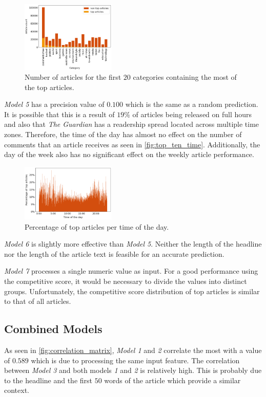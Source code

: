\begin{figure}[h]
	\includegraphics[width=0.4\textwidth]{fig/top_ten_category.png}
	\caption{\textmd{Number of articles for the first $20$ categories containing the most of the top articles.}}
	\label{fig:top_ten_category}
\end{figure}

\textit{Model 5} has a precision value of $0.100$ which is the same as a random prediction.
It is possible that this is a result of $19\%$ of articles being released on full hours and also that \textit{The Guardian} has a readership spread located across multiple time zones.
Therefore, the time of the day has almost no effect on the number of comments that an article receives as seen in \autoref{fig:top_ten_time}. 
Additionally, the day of the week also has no significant effect on the weekly article performance. 

\begin{figure}[h]
	\includegraphics[width=0.4\textwidth]{fig/top_ten_time.png}
	\caption{\textmd{Percentage of top articles per time of the day.}}
	\label{fig:top_ten_time}
\end{figure}

\textit{Model 6} is slightly more effective than \textit{Model 5}. 
Neither the length of the headline nor the length of the article text is feasible for an accurate prediction.

\textit{Model 7} processes a single numeric value as input. 
For a good performance using the competitive score, it would be necessary to divide the values into distinct groups.
Unfortunately, the competitive score distribution of top articles is similar to that of all articles.

\subsection{Combined Models}
As seen in \autoref{fig:correlation_matrix}, \textit{Model 1} and \textit{2} correlate the most with a value of $0.589$ which is due to processing the same input feature.
The correlation between \textit{Model 3} and both models \textit{1} and \textit{2} is relatively high. 
This is probably due to the headline and the first $50$ words of the article which provide a similar context.

